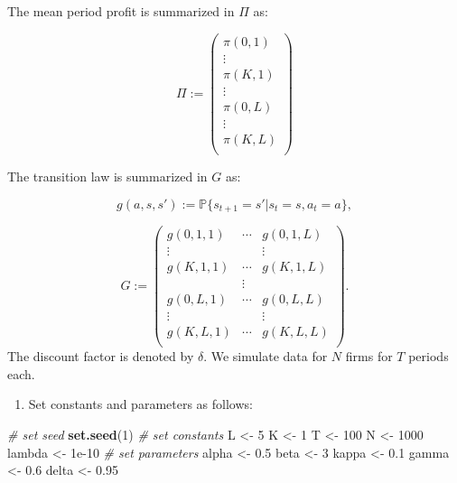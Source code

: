 \documentclass[
]{book}
\newenvironment{Shaded}{\begin{snugshade}}{\end{snugshade}}
\newcommand{\CommentTok}[1]{\textcolor[rgb]{0.56,0.35,0.01}{\textit{#1}}}
\newcommand{\DecValTok}[1]{\textcolor[rgb]{0.00,0.00,0.81}{#1}}
\newcommand{\FloatTok}[1]{\textcolor[rgb]{0.00,0.00,0.81}{#1}}
\newcommand{\KeywordTok}[1]{\textcolor[rgb]{0.13,0.29,0.53}{\textbf{#1}}}
\newcommand{\NormalTok}[1]{#1}
\newcommand{\StringTok}[1]{\textcolor[rgb]{0.31,0.60,0.02}{#1}}
\providecommand{\tightlist}{%
  \setlength{\itemsep}{0pt}\setlength{\parskip}{0pt}}
\begin{document}
The mean period profit is summarized in \(\Pi\) as:

\[
\Pi :=
\begin{pmatrix}
\pi(0, 1)\\
\vdots\\
\pi(K, 1)\\
\vdots \\
\pi(0, L)\\
\vdots\\
\pi(K, L)\\
\end{pmatrix}
\]

The transition law is summarized in \(G\) as:

\[
g(a, s, s') := \mathbb{P}\{s_{t + 1} = s'|s_t = s, a_t = a\},
\]

\[
G := 
\begin{pmatrix}
g(0, 1, 1) & \cdots & g(0, 1, L)\\
\vdots & & \vdots \\
g(K, 1, 1) & \cdots & g(K, 1, L)\\
& \vdots & \\
g(0, L, 1) & \cdots & g(0, L, L)\\
\vdots & & \vdots \\
g(K, L, 1) & \cdots & g(K, L, L)\\
\end{pmatrix}.
\]
The discount factor is denoted by \(\delta\). We simulate data for \(N\) firms for \(T\) periods each.

\begin{enumerate}
\def\labelenumi{\arabic{enumi}.}
\tightlist
\item
  Set constants and parameters as follows:
\end{enumerate}

\begin{Shaded}
\begin{Highlighting}[]
\CommentTok{# set seed}
\KeywordTok{set.seed}\NormalTok{(}\DecValTok{1}\NormalTok{)}
\CommentTok{# set constants }
\NormalTok{L <-}\StringTok{ }\DecValTok{5}
\NormalTok{K <-}\StringTok{ }\DecValTok{1}
\NormalTok{T <-}\StringTok{ }\DecValTok{100}
\NormalTok{N <-}\StringTok{ }\DecValTok{1000}
\NormalTok{lambda <-}\StringTok{ }\FloatTok{1e-10}
\CommentTok{# set parameters}
\NormalTok{alpha <-}\StringTok{ }\FloatTok{0.5}
\NormalTok{beta <-}\StringTok{ }\DecValTok{3}
\NormalTok{kappa <-}\StringTok{ }\FloatTok{0.1}
\NormalTok{gamma <-}\StringTok{ }\FloatTok{0.6}
\NormalTok{delta <-}\StringTok{ }\FloatTok{0.95}
\end{Highlighting}
\end{Shaded}
\end{document}
